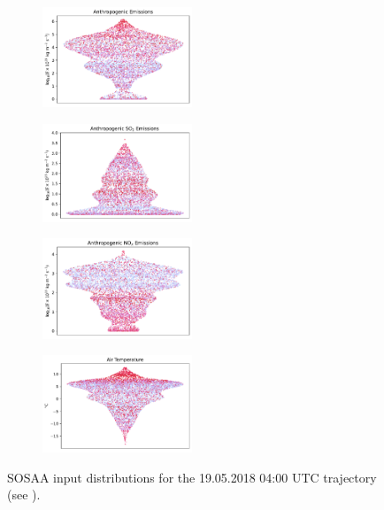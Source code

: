 \begin{figure}[H]
    \begin{subfigure}
        \centering
        \includegraphics[width=0.49\textwidth,valign=t]{sosaa-data/figures/trajectories/trajectory-19.05.2018:04.00-anthropogenic.pdf}
    \end{subfigure}
    \begin{subfigure}
        \centering
        \includegraphics[width=0.49\textwidth,valign=t]{sosaa-data/figures/trajectories/trajectory-19.05.2018:04.00-so2.pdf}
    \end{subfigure}

    \begin{subfigure}
        \centering
        \includegraphics[width=0.49\textwidth,valign=t]{sosaa-data/figures/trajectories/trajectory-17.05.2018:00.00-nox.pdf}
    \end{subfigure}
    \begin{subfigure}
        \centering
        \includegraphics[width=0.49\textwidth,valign=t]{sosaa-data/figures/trajectories/trajectory-19.05.2018:04.00-temperature.pdf}
    \end{subfigure}

    \caption[Inputs for the 19.05.2018 04:00 UTC Trajectory]{SOSAA input distributions for the 19.05.2018 04:00 UTC trajectory (see ).}
    \label{fig:trajectory-inputs-19-05}
\end{figure}

